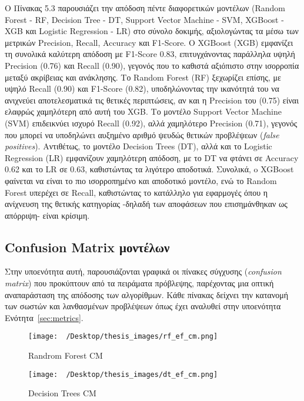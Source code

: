 \documentclass[diploma]{softlab-thesis}
\begin{document}
\begin{enumerate}
\begin{enumerate}
Ο Πίνακας 5.3 παρουσιάζει την απόδοση πέντε διαφορετικών μοντέλων (Random Forest - RF, Decision Tree - DT, Support Vector Machine - SVM, XGBoost - XGB και Logistic Regression - LR) στο σύνολο δοκιμής, αξιολογώντας τα μέσω των μετρικών Precision, Recall, Accuracy και F1-Score. O XGBoost (XGB) εμφανίζει τη συνολικά καλύτερη απόδοση με F1-Score 0.83, επιτυγχάνοντας παράλληλα υψηλή Precision (0.76) και Recall (0.90), γεγονός που το καθιστά αξιόπιστο στην ισορροπία μεταξύ ακρίβειας και ανάκλησης. Το Random Forest (RF) ξεχωρίζει επίσης, με υψηλό Recall (0.90) και F1-Score (0.82), υποδηλώνοντας την ικανότητά του να ανιχνεύει αποτελεσματικά τις θετικές περιπτώσεις, αν και η Precision του (0.75) είναι ελαφρώς χαμηλότερη από αυτή του XGB.
Το μοντέλο Support Vector Machine (SVM) επιδεικνύει ισχυρό Recall (0.92), αλλά χαμηλότερο Precision (0.71), γεγονός που μπορεί να υποδηλώνει αυξημένο αριθμό ψευδώς θετικών προβλέψεων (\textit
{false positives}). Αντιθέτως, το μοντέλο Decision Trees (DT), αλλά και το Logistic Regression (LR) εμφανίζουν χαμηλότερη απόδοση, με το DT να φτάνει σε Accuracy 0.62 και το LR σε 0.63, καθιστώντας τα λιγότερο αποδοτικά.
Συνολικά, o XGBoost φαίνεται να είναι το πιο ισορροπημένο και αποδοτικό μοντέλο, ενώ το Random Forest υπερέχει σε Recall, καθιστώντας το κατάλληλο για εφαρμογές όπου η ανίχνευση της θετικής κατηγορίας -δηλαδή των αποφάσεων που επισημάνθηκαν ως απόρριψη- είναι κρίσιμη.

\subsection{Confusion Matrix μοντέλων}

Στην υποενότητα αυτή, παρουσιάζονται γραφικά οι πίνακες σύγχυσης (\textit{confusion matrix}) που προκύπτουν από τα πειράματα πρόβλεψης, παρέχοντας μια οπτική αναπαράσταση της απόδοσης των αλγορίθμων. Κάθε πίνακας δείχνει την κατανομή των σωστών και λανθασμένων προβλέψεων όπως έχει αναλυθεί στην υποενότητα Ενότητα~\ref{sec:metrics}.

\begin{figure}[H]
    \centering
    \texttt{[image: ~/Desktop/thesis\_images/rf\_ef\_cm.png]} %
    \caption{Randrom Forest CM}
    \label{fig:your_image_label}
\end{figure}

\begin{figure}[H]
    \centering
    \texttt{[image: ~/Desktop/thesis\_images/dt\_ef\_cm.png]} %
    \caption{Decision Trees CM}
    \label{fig:your_image_label}
\end{figure}



\end{enumerate}
\end{enumerate}
\end{document}
